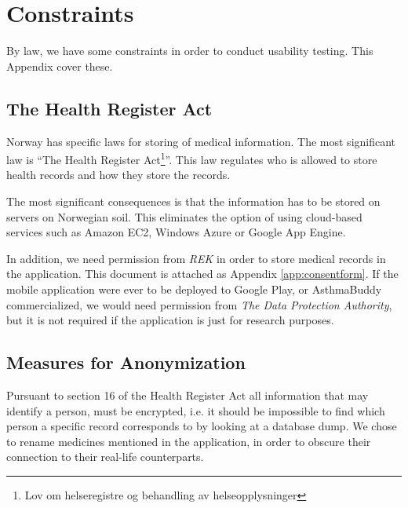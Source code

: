 
\chapter{Constraints}
\label{chp:securityrequirements}

By law, we have some constraints in order to conduct usability testing. This Appendix cover these. 

\section{The Health Register Act}
\label{sec:helseregisterloven}

Norway has specific laws for storing of medical information. The most significant law is ``The Health Register Act\footnote{Lov om helseregistre og behandling av helseopplysninger}''\cite{helseregisterloven}. This law regulates who is allowed to store health records and how they store the records. 

The most significant consequences is that the information has to be stored on servers on Norwegian soil. This eliminates the option of using cloud-based services such as Amazon EC2, Windows Azure or Google App Engine. 

In addition, we need permission from \emph{REK} in order to store medical records in the application. This document is attached as Appendix \ref{app:consentform}. If the mobile application were ever to be deployed to Google Play, or AsthmaBuddy commercialized, we would need permission from \emph{The Data Protection Authority}, but it is not required if the application is just for research purposes. 

\section{Measures for Anonymization}
\label{sec:measuresforanonymization}
Pursuant to section 16 of the Health Register Act\cite{helseregisterloven} all information that may identify a person, must be encrypted, i.e. it should be impossible to find which person a specific record corresponds to by looking at a database dump. We chose to rename medicines mentioned in the application, in order to obscure their connection to their real-life counterparts. 